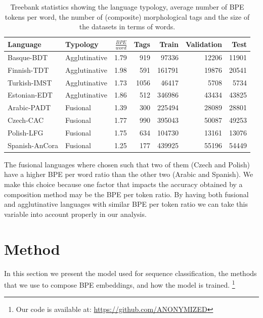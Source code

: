 \documentclass[11pt]{article}
\begin{document}
    
    \begin{table}
		\centering
		\begin{tabular}{l|lrrrrr}
			Language & Typology & $\frac{BPE}{word}$ & Tags & Train & Validation & Test \\
			\hline
			Basque-BDT      & Agglutinative & 1.79 & 919 & 97336 & 12206 & 11901 \\
			Finnish-TDT     & Agglutinative & 1.98 & 591 & 161791 & 19876 & 20541 \\
			Turkish-IMST    & Agglutinative & 1.73 & 1056 & 46417 & 5708 & 5734 \\
			Estonian-EDT    & Agglutinative & 1.86 & 512 & 346986 & 43434 & 43825 \\
            Arabic-PADT     & Fusional & 1.39 & 300 & 225494 & 28089 & 28801  \\
			Czech-CAC       & Fusional & 1.77 & 990 & 395043 & 50087 & 49253 \\
			Polish-LFG      & Fusional & 1.75 & 634 & 104730 & 13161 & 13076 \\
			Spanish-AnCora  & Fusional & 1.25 & 177 & 439925 & 55196 & 54449 \\
        \end{tabular}
    		\caption{\label{tab:data} Treebank statistics showing the
     language typology, average number of BPE tokens per word, the
     number of (composite) morphological tags and the size of the datasets in
     terms of words.}
	\end{table}
    
        The fusional languages where chosen such that two of them
        (Czech and Polish) have a higher BPE per word ratio than the
        other two (Arabic and Spanish). We make this choice because
        one factor that impacts the accuracy obtained by a composition
        method may be the BPE per token ratio.  By having both
        fusional and agglutinative languages with similar BPE per
        token ratio we can take this variable into account properly in
        our analysis.
        
	\section{Method}
	\label{method}
    	In this section we present the model used for sequence
     classification, the methods that we use to compose BPE
     embeddings, and how the model is trained. \footnote{Our code is
     available at: \url{https://github.com/ANONYMIZED}}
\end{document}
